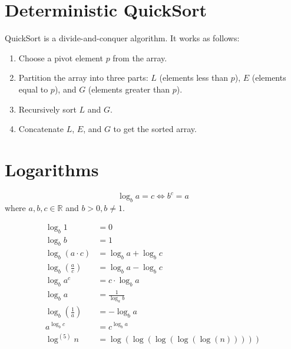 \section{Deterministic QuickSort}
\begin{definition}
    [QuickSort]
    QuickSort is a divide-and-conquer algorithm. It works as follows:
    \begin{enumerate}
        \item Choose a pivot element $p$ from the array.
        \item Partition the array into three parts: $L$ (elements less than $p$), $E$ (elements equal to $p$), and $G$ (elements greater than $p$).
        \item Recursively sort $L$ and $G$.
        \item Concatenate $L$, $E$, and $G$ to get the sorted array.
    \end{enumerate}
\end{definition}

\section{Logarithms}
\begin{definition}
    [Logarithm]
    \[
        \log_b a = c \iff b^c = a
    \]
    where $a, b, c \in \mathbb{R}$ and $b > 0, b \neq 1$.
\end{definition}
\begin{definition}
    \begin{align*}
        \log_b 1                          & = 0                               \\
        \log_b b                          & = 1                               \\
        \log_b (a \cdot c)                & = \log_b a + \log_b c             \\
        \log_b \left( \frac{a}{c} \right) & = \log_b a - \log_b c             \\
        \log_b a^c                        & = c \cdot \log_b a                \\
        \log_b a                          & = \frac{1}{\log_a b}              \\
        \log_b(\frac{1}{a})               & = -\log_b a                       \\
        a^{\log_b c}                      & = c^{\log_b a}                    \\
        \log^(5)n                         & = \log(\log(\log(\log(\log(n)))))
    \end{align*}
\end{definition}

